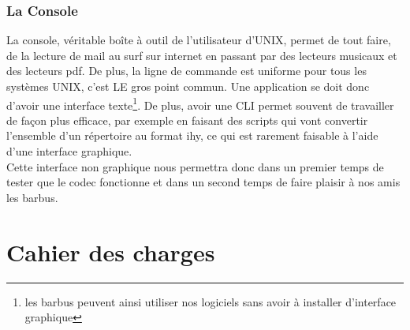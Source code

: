 \documentclass[a4paper,12pt]{article}
\begin{document}
		\subsubsection{La Console}
La console,  véritable boîte à outil de l'utilisateur d'UNIX,  permet de
tout faire,  de la  lecture de mail au surf sur  internet en passant par
des  lecteurs  musicaux et  des  lecteurs  pdf.  De  plus,  la  ligne de
commande est uniforme pour tous  les systèmes UNIX,  c'est LE gros point
commun.   Une   application  se   doit   donc   d'avoir   une  interface
texte\footnote{les barbus  peuvent ainsi utiliser  nos logiciels sans
avoir à installer d'interface graphique}.  De plus,  avoir une CLI
permet souvent de  travailler de façon plus efficace,  par
exemple  en  faisant des  scripts  qui  vont  convertir  l'ensemble d'un
répertoire au format  ihy,  ce qui est rarement faisable  à l'aide d'une
interface graphique.\\
Cette interface non graphique nous  permettra donc dans un premier temps
de  tester que  le codec  fonctionne et  dans un  second temps  de faire
plaisir à nos amis les barbus.

\newpage

\section{Cahier des charges}
\end{document}
